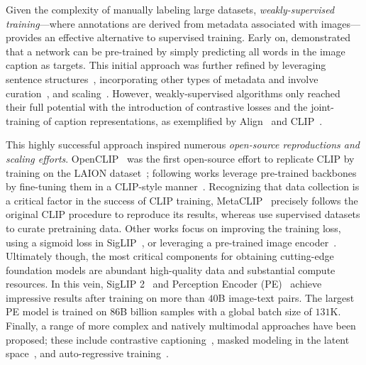 Given the complexity of manually labeling large datasets, \emph{weakly-supervised training}---where annotations are derived from metadata associated with images---provides an effective alternative to supervised training.
Early on, \citet{joulin2016learning} demonstrated that a network can be pre-trained by simply predicting all words in the image caption as targets. 
This initial approach was further refined by leveraging sentence structures~\citep{li2017learning}, incorporating other types of metadata and involve curation~\citep{mahajan2018exploring}, and scaling~\citep{singh2022revisiting}.
However, weakly-supervised algorithms only reached their full potential with the introduction of contrastive losses and the joint-training of caption representations, as exemplified by Align~\citep{jia2021scaling} and CLIP~\citep{radford2021learning}.

This highly successful approach inspired numerous \emph{open-source reproductions and scaling efforts}. 
OpenCLIP~\citep{cherti2023reproducible} was the first open-source effort to replicate CLIP by training on the LAION dataset~\citep{schuhmann2021laion}; following works leverage pre-trained backbones by fine-tuning them in a CLIP-style manner~\citep{sun2023eva,sun2024eva}.
Recognizing that data collection is a critical factor in the success of CLIP training, MetaCLIP~\citep{xu2024demystifying} precisely follows the original CLIP procedure to reproduce its results, whereas \citet{fang2024data} use supervised datasets to curate pretraining data.
Other works focus on improving the training loss, \eg using a sigmoid loss in SigLIP~\citep{zhai2023sigmoid}, or leveraging a pre-trained image encoder~\citep{zhai2022lit}.
Ultimately though, the most critical components for obtaining cutting-edge foundation models are abundant high-quality data and substantial compute resources.
In this vein, SigLIP 2~\citep{tschannen2025siglip} and Perception Encoder (PE)~\citep{bolya2025perception} achieve impressive results after training on more than $40$B image-text pairs.
The largest PE model is trained on $86$B billion samples with a global batch size of $131$K.
Finally, a range of more complex and natively multimodal approaches have been proposed; these include contrastive captioning~\citep{yu2022coca}, masked modeling in the latent space~\citep{bao2021beit, wang2022image, fang2022eva, wang2023onepeace}, and auto-regressive training~\citep{fini2024multimodal}.

